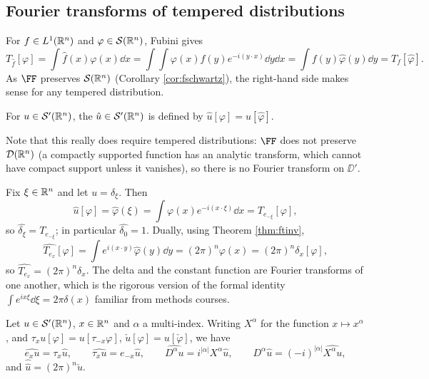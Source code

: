 \documentclass[a4paper]{scrartcl}
\newcommand{\Sch}{\mathcal{S}}
\begin{document}
\subsection{Fourier transforms of tempered distributions}

For $f \in L^1(\mathbb{R}^n)$ and $\varphi\in\Sch(\R^n)$, Fubini gives
$$T_{\hat f}[\varphi]=\int\hat f(x)\varphi(x)\dd x = \int\!\!\int \varphi(x)f(y)e^{-i(y\cdot x)}\dd y \dd x = \int f(y)\hat\varphi(y)\dd y = T_f[\hat\varphi].$$
As $\FF$ preserves $\Sch(\R^n)$ (Corollary \ref{cor:fschwartz}), the right-hand side makes sense for any tempered distribution.

\begin{definition}
	For $u \in \Sch'(\R^n)$, the  $\hat u \in \Sch'(\R^n)$ is defined by $\hat u[\varphi]=u[\hat\varphi]$.
\end{definition}

Note that this really does require tempered distributions: $\FF$ does not preserve $\mathcal{D}(\mathbb{R}^n)$ (a compactly supported function has an analytic transform, which cannot have compact support unless it vanishes), so there is no Fourier transform on $\DD'$.

\begin{example}\label{ex:deltahat}
	Fix $\xi \in \mathbb{R}^n$ and let $u = \delta_\xi$. Then
	$$\hat u[\varphi]=\hat\varphi(\xi)=\int\varphi(x)e^{-i(x\cdot\xi)}\dd x = T_{e_{-\xi}}[\varphi],$$
	so $\hat{\delta_\xi}=T_{e_{-\xi}}$; in particular $\hat{\delta_0}=1$. Dually, using Theorem \ref{thm:ftinv},
	$$\widehat{T_{e_x}}[\varphi]=\int e^{i(x\cdot y)}\hat\varphi(y)\dd y = (2\pi)^n\varphi(x)=(2\pi)^n\delta_x[\varphi],$$
	so $\widehat{T_{e_x}}=(2\pi)^n\delta_x$. The delta and the constant function are Fourier transforms of one another, which is the rigorous version of the formal identity $\int e^{i x\xi}\dd\xi = 2\pi\delta(x)$ familiar from methods courses.
\end{example}

\begin{lemma}\label{lem:tempft}
	Let $u \in \Sch'(\R^n)$, $x\in\mathbb{R}^n$ and $\alpha$ a multi-index. Writing $X^\alpha$ for the function $x\mapsto x^\alpha$, and $\tau_xu[\varphi]=u[\tau_{-x}\varphi]$, $\check u[\varphi]=u[\check\varphi]$, we have
	$$\widehat{e_xu}=\tau_x\hat u, \qquad \widehat{\tau_xu}=e_{-x}\hat u, \qquad \widehat{D^\alpha u}=i^{|\alpha|}X^\alpha\hat u, \qquad D^\alpha\hat u = (-i)^{|\alpha|}\widehat{X^\alpha u},$$
	and $\hat{\hat u}=(2\pi)^n\check u$.
\end{lemma}
\end{document}
